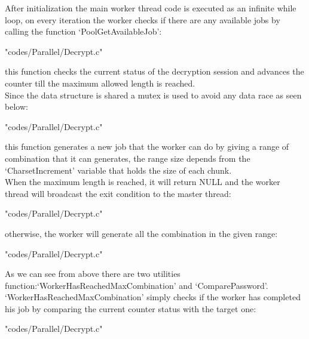 \documentclass[10pt,twocolumn,letterpaper]{article}
\begin{document}
After initialization the main worker thread code is executed as an infinite while loop, on every iteration the worker checks if there 
are any available jobs by calling the function `PoolGetAvailableJob':\\
\begin{lstinputlisting}[language=C,style=CSnippetStyle,caption=PoolGetAvailableJob Function,firstline=120,lastline=120]
		{"codes/Parallel/Decrypt.c"}
\end{lstinputlisting}
this function checks the current status of the decryption session and advances the counter till the maximum allowed length is reached.\\
Since the data structure is shared a mutex is used to avoid any data race as seen below:\\
\begin{lstinputlisting}[language=C,style=CSnippetStyle,caption=PoolGetAvailableJob Function,firstline=57,lastline=87]
		{"codes/Parallel/Decrypt.c"}
\end{lstinputlisting}
this function generates a new job that the worker can do by giving a range of combination that it can generates, the range size depends
from the `CharsetIncrement' variable that holds the size of each chunk.\\
When the maximum length is reached, it will return NULL and the worker thread will broadcast the exit condition to the master
thread:\\
\begin{lstinputlisting}[language=C,style=CSnippetStyle,caption=Worker Exit,firstline=121,lastline=124]
		{"codes/Parallel/Decrypt.c"}
\end{lstinputlisting}
otherwise, the worker will generate all the combination in the given range:
\begin{lstinputlisting}[language=C,style=CSnippetStyle,caption=Worker Combination Generator,firstline=139,lastline=163]
		{"codes/Parallel/Decrypt.c"}
\end{lstinputlisting}
As we can see from above there are two utilities function:`WorkerHasReachedMaxCombination' and `ComparePassword'.\\
`WorkerHasReachedMaxCombination' simply checks if the worker has completed his job by comparing the current counter status with the
target one:\\
\begin{lstinputlisting}[language=C,style=CSnippetStyle,caption=WorkerHasReachedMaxCombination Function,firstline=42,lastline=55]
		{"codes/Parallel/Decrypt.c"}
\end{lstinputlisting}
\end{document}
